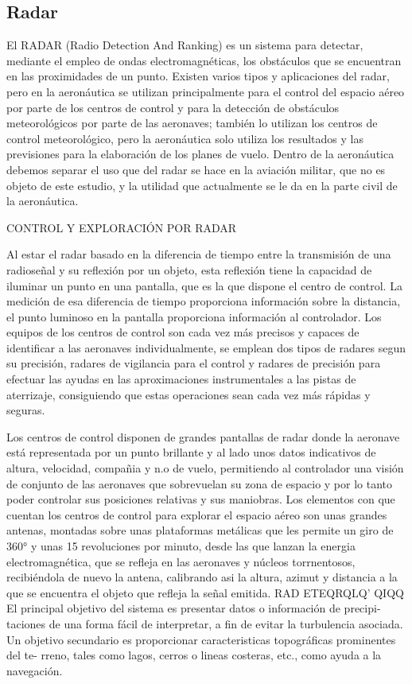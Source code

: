 
\subsection{Radar}
\label{sec:radar}

El RADAR (Radio Detection And Ranking) es un sistema para detectar, mediante el empleo de ondas electromagnéticas, los obstáculos que se encuentran en las proximidades de un punto. Existen varios tipos y aplicaciones del radar, pero en la aeronáutica se utilizan principalmente para el control del espacio aéreo por parte de los centros de control y para la detección de obstáculos meteorológicos por parte de las aeronaves; también lo utilizan los centros de control meteorológico, pero la aeronáutica solo utiliza los resultados y las previsiones para la elaboración de los planes de vuelo. Dentro de la aeronáutica debemos separar el uso que del radar se hace en la aviación militar, que no es objeto de este estudio, y la utilidad que actualmente se le da en la parte civil de la aeronáutica.

CONTROL Y EXPLORACIÓN POR RADAR

Al estar el radar basado en la diferencia de tiempo entre la transmisión de una radioseñal y su reﬂexión por un objeto, esta reﬂexión tiene la capacidad de iluminar un punto en una pantalla, que es la que dispone el centro de control. La medición de esa diferencia de tiempo proporciona información sobre la distancia, el punto luminoso en la pantalla proporciona información al controlador. Los equipos de los centros de control son cada vez más precisos y capaces de identiﬁcar a las aeronaves individualmente, se emplean dos tipos de radares segun su precisión, radares de vigilancia para el control y radares de precisión para efectuar las ayudas en las aproximaciones instrumentales a las pistas de aterrizaje, consiguiendo que estas operaciones sean cada vez más rápidas y seguras.

Los centros de control disponen de grandes pantallas de radar donde la aeronave está representada por un punto brillante y al lado unos datos indicativos de altura, velocidad, compañia y n.o de vuelo, permitiendo al controlador una visión de conjunto de las aeronaves que sobrevuelan su zona de espacio y por lo tanto poder controlar sus posiciones relativas y sus maniobras. Los elementos con que cuentan los centros de control para explorar el espacio aéreo son unas grandes antenas, montadas sobre unas plataformas metálicas que les permite un giro de 360° y unas 15 revoluciones por minuto, desde las que lanzan la energia electromagnética, que se reﬂeja en las aeronaves y núcleos torrnentosos, recibiéndola de nuevo la antena, calibrando asi la altura, azimut y distancia a la que se encuentra el objeto que reﬂeja la señal emitida. RAD ETEQRQLQ’ QIQQ El principal objetivo del sistema es presentar datos o información de precipi- taciones de una forma fácil de interpretar, a ﬁn de evitar la turbulencia asociada. Un objetivo secundario es proporcionar caracteristicas topográﬁcas prominentes del te- rreno, tales como lagos, cerros o lineas costeras, etc., como ayuda a la navegación.


